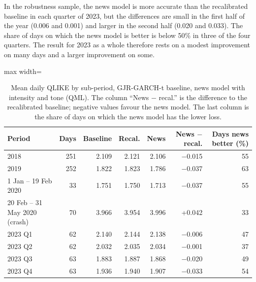 \documentclass[12pt,a4paper]{article}
\begin{document}
In the robustness sample, the news model is more accurate than the recalibrated baseline in each quarter of 2023, but the differences are small in the first half of the year (0.006 and 0.001) and larger in the second half (0.020 and 0.033). The share of days on which the news model is better is below 50\% in three of the four quarters. The result for 2023 as a whole therefore rests on a modest improvement on many days and a larger improvement on some.

\begin{table}[htbp]
  \centering\small
  \caption[Out-of-sample QLIKE by sub-period]{Mean daily QLIKE by sub-period, GJR-GARCH-t baseline, news model with intensity and tone (QML). The column \enquote{News $-$ recal.} is the difference to the recalibrated baseline; negative values favour the news model. The last column is the share of days on which the news model has the lower loss.}
  \label{tab:subperiods}
  \begin{adjustbox}{max width=\textwidth}
  \begin{tabular}{lrrrrrr}
    \toprule
    Period & Days & Baseline & Recal. & News & News $-$ recal. & Days news better (\%) \\
    \midrule
    2018 & 251 & 2.109 & 2.121 & 2.106 & $-$0.015 & 55 \\
    2019 & 252 & 1.822 & 1.823 & 1.786 & $-$0.037 & 63 \\
    1 Jan -- 19 Feb 2020 & 33 & 1.751 & 1.750 & 1.713 & $-$0.037 & 55 \\
    20 Feb -- 31 May 2020 (crash) & 70 & 3.966 & 3.954 & 3.996 & +0.042 & 33 \\
    \midrule
    2023 Q1 & 62 & 2.140 & 2.144 & 2.138 & $-$0.006 & 47 \\
    2023 Q2 & 62 & 2.032 & 2.035 & 2.034 & $-$0.001 & 37 \\
    2023 Q3 & 63 & 1.883 & 1.887 & 1.868 & $-$0.020 & 49 \\
    2023 Q4 & 63 & 1.936 & 1.940 & 1.907 & $-$0.033 & 54 \\
    \bottomrule
  \end{tabular}
  \end{adjustbox}
\end{table}
\end{document}
